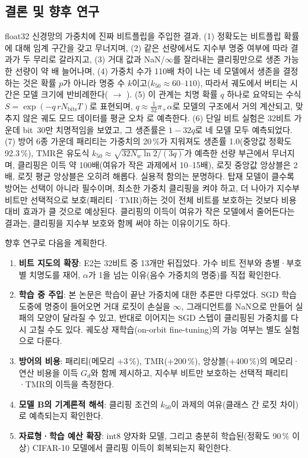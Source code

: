 \documentclass[11pt,a4paper]{article}
\begin{document}
\subsection{결론 및 향후 연구}
\label{sec:future}
float32 신경망의 가중치에 진짜 비트플립을 주입한 결과, (1) 정확도는 비트플립 확률에 대해 임계 구간을 갖고 무너지며, (2) 같은 선량에서도 지수부 명중 여부에 따라 결과가 두 무리로 갈라지고, (3) 거대 값과 NaN/$\infty$를 잘라내는 클리핑만으로 생존 가능한 선량이 약 \PhalfRatio{}배 늘어나며, (4) 가중치 수가 110배 차이 나는 네 모델에서 생존을 결정하는 것은 확률 $p$가 아니라 명중 수 $k$이고($k_{50}\approx60$--$110$), 따라서 궤도에서 버티는 시간은 모델 크기에 반비례한다(\DaysNoneLinear{} $\to$ \DaysNoneResnet{}). (5) 이 관계는 치명 확률 $q$ 하나로 요약되는 수식 $S=\exp(-q\,rN_{\mathrm{bits}}T)$로 표현되며, $q\approx\tfrac{1}{32}\pi_+\alpha$로 모델의 구조에서 거의 계산되고, 맞추지 않은 궤도 모드 데이터를 평균 오차 \EthreeMAE{}로 예측한다. (6) 단일 비트 실험은 32비트 가운데 bit~30만 치명적임을 보였고, 그 생존률은 $1-32q$로 네 모델 모두 예측되었다. (7) 방어 6종 가운데 패리티는 가중치의 20\,\%가 지워져도 생존률 1.0(중앙값 정확도 92.3\,\%), TMR은 유도식 $k_{50}\approx\sqrt{32N_w\ln2/(3q)}$가 예측한 선량 부근에서 무너지며, 클리핑은 이득 약 100배(여유가 작은 과제에서 10--15배), 로짓 중앙값 앙상블은 2배, 로짓 평균 앙상블은 오히려 해롭다. 실용적 함의는 분명하다. 탑재 모델이 클수록 방어는 선택이 아니라 필수이며, 최소한 가중치 클리핑을 켜야 하고, 더 나아가 지수부 비트만 선택적으로 보호(패리티·TMR)하는 것이 전체 비트를 보호하는 것보다 비용 대비 효과가 클 것으로 예상된다. 클리핑의 이득이 여유가 작은 모델에서 줄어든다는 결과는, 클리핑을 지수부 보호와 함께 써야 하는 이유이기도 하다.

향후 연구로 다음을 계획한다.
\begin{enumerate}[leftmargin=*]
  \item \textbf{비트 지도의 확장}: E2는 32비트 중 13개만 뒤집었다. 가수 비트 전부와 층별·부호별 치명도를 재어, $\alpha$가 1을 넘는 이유(음수 가중치의 명중)를 직접 확인한다.
  \item \textbf{학습 중 주입}: 본 논문은 학습이 끝난 가중치에 대한 추론만 다루었다. SGD 학습 도중에 명중이 들어오면 거대 로짓이 손실을 $\infty$, 그래디언트를 NaN으로 만들어 실패의 모양이 달라질 수 있고, 반대로 이어지는 SGD 스텝이 클리핑된 가중치를 다시 고칠 수도 있다. 궤도상 재학습(on-orbit fine-tuning)의 가능 여부는 별도 실험으로 다룬다.
  \item \textbf{방어의 비용}: 패리티(메모리 +3\,\%), TMR(+200\,\%), 앙상블(+400\,\%)의 메모리·연산 비용을 이득 $G_d$와 함께 제시하고, 지수부 비트만 보호하는 선택적 패리티·TMR의 이득을 측정한다.
  \item \textbf{모델 B의 기계론적 해석}: 클리핑 조건의 $k_{50}$이 과제의 여유(클래스 간 로짓 차이)로 예측되는지 확인한다.
  \item \textbf{자료형·학습 예산 확장}: int8 양자화 모델, 그리고 충분히 학습된(정확도 90\,\% 이상) CIFAR-10 모델에서 클리핑 이득이 회복되는지 확인한다.
\end{enumerate}
\end{document}
